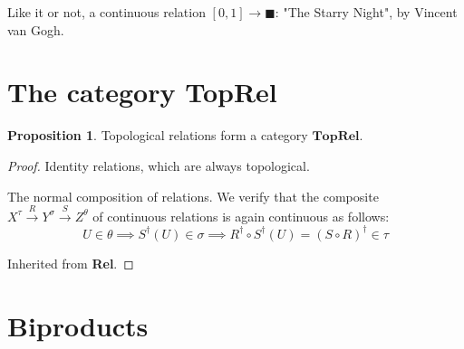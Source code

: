\documentclass{tufte-handout}
\theoremstyle{definition}
\newtheorem{proposition}[theorem]{Proposition}
\begin{document}
\begin{marginfigure}
\centering
{}
\caption{Like it or not, a continuous relation $[0,1] \rightarrow \blacksquare$: "The Starry Night", by Vincent van Gogh.}
\end{marginfigure}

\section{The category \textbf{TopRel}}

\begin{proposition}
Topological relations form a category $\mathbf{TopRel}$.
\begin{proof}
 Identity relations, which are always topological.

 The normal composition of relations. We verify that the composite $X^\tau \overset{R}{\rightarrow} Y^\sigma \overset{S}{\rightarrow} Z^\theta$ of continuous relations is again continuous as follows:
\[U \in \theta \implies S^\dag(U) \in \sigma \implies R^\dag \circ S^\dag(U) = (S \circ R)^\dag \in \tau\]

 Inherited from \textbf{Rel}.
\end{proof}
\end{proposition}

\section{Biproducts}
\end{document}
